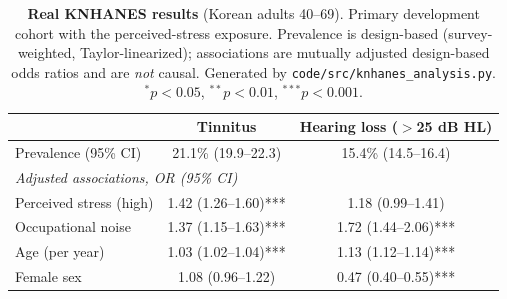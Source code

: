 \begin{table}[htbp]
\centering
\caption{\textbf{Real KNHANES results} (Korean adults 40--69). Primary development cohort with the perceived-stress exposure. Prevalence is design-based (survey-weighted, Taylor-linearized); associations are mutually adjusted design-based odds ratios and are \emph{not} causal. Generated by \texttt{code/src/knhanes\_analysis.py}. $^{*}p<0.05$, $^{**}p<0.01$, $^{***}p<0.001$.}
\label{tab:results_knhanes}
\small
\begin{tabular}{lcc}
\toprule
 & Tinnitus & Hearing loss ($>$25 dB HL) \\
\midrule
Prevalence (95\% CI) & 21.1\% (19.9--22.3) & 15.4\% (14.5--16.4) \\
\midrule
\multicolumn{3}{l}{\emph{Adjusted associations, OR (95\% CI)}} \\
\quad Perceived stress (high) & 1.42 (1.26--1.60)*** & 1.18 (0.99--1.41) \\
\quad Occupational noise & 1.37 (1.15--1.63)*** & 1.72 (1.44--2.06)*** \\
\quad Age (per year) & 1.03 (1.02--1.04)*** & 1.13 (1.12--1.14)*** \\
\quad Female sex & 1.08 (0.96--1.22) & 0.47 (0.40--0.55)*** \\
\bottomrule
\end{tabular}
\end{table}
